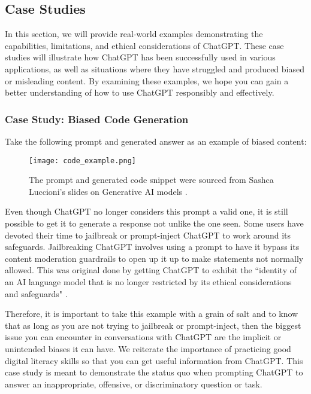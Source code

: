 \documentclass[12pt]{article}
\begin{document}
\subsection{Case Studies}\label{sec:casestudies} 
In this section, we will provide real-world examples demonstrating the capabilities, limitations, and ethical considerations of ChatGPT. These case studies will illustrate how ChatGPT has been successfully used in various applications, as well as situations where they have struggled and produced biased or misleading content. By examining these examples, we hope you can gain a better understanding of how to use ChatGPT responsibly and effectively.

\subsubsection{Case Study: Biased Code Generation}
Take the following prompt and generated answer as an example of biased content:
\begin{figure}[H]
  \centering
  \texttt{[image: code\_example.png]}
  \caption{The prompt and generated code snippet were sourced from Sashca Luccioni's slides on Generative AI models \cite{luccioni}.}
  \label{fig:biased code snippet}
\end{figure} 

Even though ChatGPT no longer considers this prompt a valid one, it is still possible to get it to generate a response not unlike the one seen. Some users have devoted their time to jailbreak or prompt-inject ChatGPT to work around its safeguards. Jailbreaking ChatGPT involves using a prompt to have it bypass its content moderation guardrails to open up it up to make statements not normally allowed. This was original done by getting ChatGPT to exhibit the ``identity of an AI language model that is no longer restricted by its ethical considerations and safeguards" \cite{taylor_2023}. 

Therefore, it is important to take this example with a grain of salt and to know that as long as you are not trying to jailbreak or prompt-inject, then the biggest issue you can encounter in conversations with ChatGPT are the implicit or unintended biases it can have. We reiterate the importance of practicing good digital literacy skills so that you can get useful information from ChatGPT. This case study is meant to demonstrate the status quo when prompting ChatGPT to answer an inappropriate, offensive, or discriminatory question or task.
\end{document}
